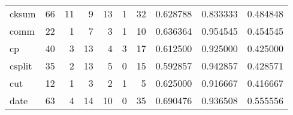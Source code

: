 \begin{longtable}{lrrrrrrrrr}
cksum     &                                      66 &                                                 11 &                                                  9 &                                                 13 &                                                  1 &                                                 32 &                                           0.628788 &                               0.833333 &                             0.484848 \\
comm      &                                      22 &                                                  1 &                                                  7 &                                                  3 &                                                  1 &                                                 10 &                                           0.636364 &                               0.954545 &                             0.454545 \\
cp        &                                      40 &                                                  3 &                                                 13 &                                                  4 &                                                  3 &                                                 17 &                                           0.612500 &                               0.925000 &                             0.425000 \\
csplit    &                                      35 &                                                  2 &                                                 13 &                                                  5 &                                                  0 &                                                 15 &                                           0.592857 &                               0.942857 &                             0.428571 \\
cut       &                                      12 &                                                  1 &                                                  3 &                                                  2 &                                                  1 &                                                  5 &                                           0.625000 &                               0.916667 &                             0.416667 \\
date      &                                      63 &                                                  4 &                                                 14 &                                                 10 &                                                  0 &                                                 35 &                                           0.690476 &                               0.936508 &                             0.555556 \\

\end{longtable}
